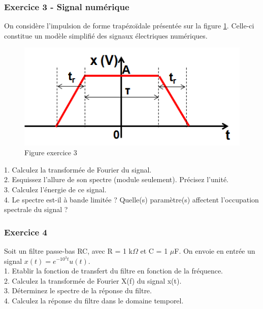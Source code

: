 	
	\subsubsection{Exercice 3 - Signal numérique}
	On considère l'impulsion de forme trapézoïdale présentée sur la figure \ref{Fig:Exo_TF_3}. Celle-ci constitue un modèle simplifié des signaux électriques numériques.
	
	\begin{figure}[h!]
		\centering
		\includegraphics[scale=0.6]{images/exo_3_TF.png}
		\caption{Figure exercice 3}	
		\label{Fig:Exo_TF_3} 
	\end{figure}

	1. Calculez la transformée de Fourier du signal.\\
	
	2. Esquissez l'allure de son spectre (module seulement). Précisez l'unité.\\
	
	3. Calculez l'énergie de ce signal.\\
	
	4. Le spectre est-il à bande limitée ? Quelle(s) paramètre(s) affectent l'occupation spectrale du signal ?\\
	

	
	\subsubsection{Exercice 4}
	Soit un filtre passe-bas RC, avec R = 1 k$\Omega$ et C = 1 $\mu$F. On envoie en entrée un signal $x(t)=e^{-10^{3}t}u(t)$.\\
	
	1. Etablir la fonction de transfert du filtre en fonction de la fréquence.\\
	
	2. Calculez la transformée de Fourier X(f) du signal x(t).\\
	
	3. Déterminez le spectre de la réponse du filtre.\\
	
	4. Calculez la réponse du filtre dans le domaine temporel.\\
